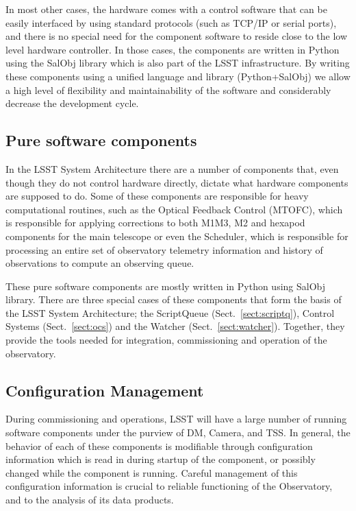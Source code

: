 In most other cases, the hardware comes with a control software that can be easily interfaced by using standard protocols (such as TCP/IP or serial ports), and there is no special need for the component software to reside close to the low level hardware controller. In those cases, the components are written in Python using the SalObj library which is also part of the LSST infrastructure. By writing these components using a unified language and library (Python+SalObj) we allow a high level of flexibility and maintainability of the software and considerably decrease the development cycle.

\subsection{Pure software components}\label{sect:software_csc}
In the LSST System Architecture there are a number of components that, even though they do not control hardware directly, dictate what hardware components are supposed to do. Some of these components are responsible for heavy computational routines, such as the Optical Feedback Control (MTOFC), which is responsible for applying corrections to both M1M3, M2 and hexapod components for the main telescope or even the Scheduler, which is responsible for processing an entire set of observatory telemetry information and history of observations to compute an observing queue.

These pure software components are mostly written in Python using SalObj library. There are three special cases of these components that form the basis of the LSST System Architecture; the ScriptQueue (Sect.~\ref{sect:scriptq}), Control Systems (Sect.~\ref{sect:ocs}) and the Watcher (Sect.~\ref{sect:watcher}). Together, they provide the tools needed for integration, commissioning and operation of the observatory.

\subsection{Configuration Management}\label{sect:config}
During commissioning and operations, LSST will have a large number of running software components under the purview of DM, Camera, and TSS. In general, the behavior of each of these components is modifiable through configuration information which is read in during startup of the component, or possibly changed while the component is running. Careful management of this configuration information is crucial to reliable functioning of the Observatory, and to the analysis of its data products.

